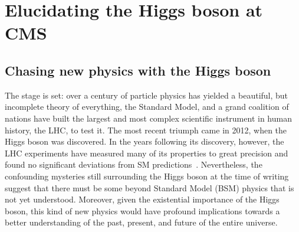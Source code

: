 \chapter{Elucidating the Higgs boson at CMS}

\section{Chasing new physics with the Higgs boson}
The stage is set: over a century of particle physics has yielded a beautiful, but incomplete theory of everything, the Standard Model, and a grand coalition of nations have built the largest and most complex scientific instrument in human history, the LHC, to test it. 
The most recent triumph came in 2012, when the Higgs boson was discovered. 
In the years following its discovery, however, the LHC experiments have measured many of its properties to great precision and found no significant deviations from SM predictions~\cite{NatureHiggsCMS2022, NatureHiggsATLAS2022}. 
Nevertheless, the confounding mysteries still surrounding the Higgs boson at the time of writing suggest that there must be some beyond Standard Model (BSM) physics that is not yet understood. 
Moreover, given the existential importance of the Higgs boson, this kind of new physics would have profound implications towards a better understanding of the past, present, and future of the entire universe. 

